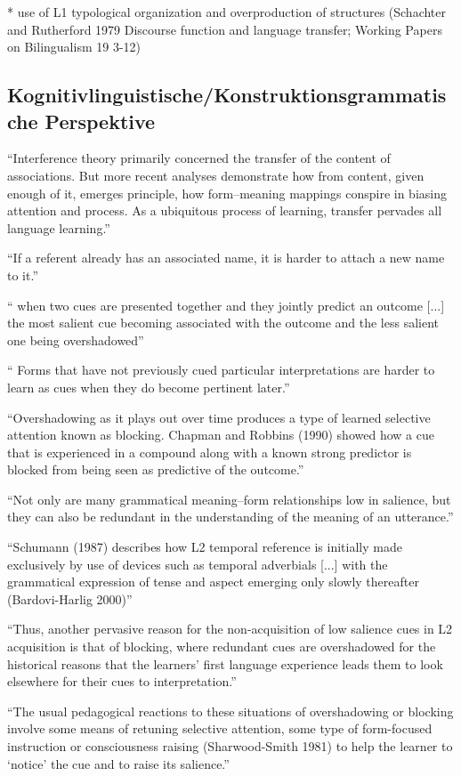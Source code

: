 * use of L1 typological organization and overproduction of structures (Schachter and Rutherford 1979 Discourse function and language transfer; Working Papers on Bilingualism 19 3-12)

\subsection{Kognitivlinguistische/Konstruktionsgrammatische Perspektive}

\cite{Ellis06} ``Interference theory primarily concerned the transfer of the content of
associations. But more recent analyses demonstrate how from content, given
enough of it, emerges principle, how form–meaning mappings conspire in
biasing attention and process. As a ubiquitous process of learning, transfer
pervades all language learning.''

``If a referent already has an associated name, it is harder to
attach a new name to it.''

`` when two cues are presented together and they
jointly predict an outcome [...] the most salient cue becoming associated with the
outcome and the less salient one being overshadowed''

`` Forms that have not
previously cued particular interpretations are harder to learn as cues when
they do become pertinent later.''

``Overshadowing as it plays out over time produces a type of learned
selective attention known as blocking. Chapman and Robbins (1990) showed
how a cue that is experienced in a compound along with a known strong
predictor is blocked from being seen as predictive of the outcome.''

``Not only are many grammatical meaning–form relationships low in salience,
but they can also be redundant in the understanding of the meaning of
an utterance.''

``Schumann (1987) describes how L2 temporal reference is initially made exclusively
by use of devices such as temporal adverbials [...] with the grammatical expression of tense and aspect emerging only
slowly thereafter (Bardovi-Harlig 2000)''

``Thus, another pervasive reason for the non-acquisition of low salience cues
in L2 acquisition is that of blocking, where redundant cues are overshadowed
for the historical reasons that the learners’ first language experience leads
them to look elsewhere for their cues to interpretation.''

``The usual pedagogical reactions to these situations of overshadowing or
blocking involve some means of retuning selective attention, some type of
form-focused instruction or consciousness raising (Sharwood-Smith 1981) to
help the learner to ‘notice’ the cue and to raise its salience.''

